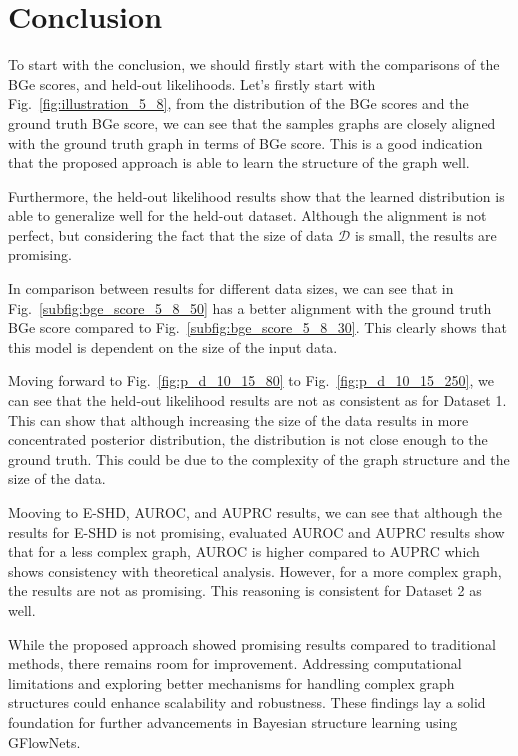 \documentclass{lxaiproposal}
\begin{document}
    \section{Conclusion}\label{sec:conclusion}
    \vspace*{-3mm}

    To start with the conclusion, we should firstly start with the comparisons of the BGe scores, and held-out
    likelihoods. Let's firstly start with Fig.~\ref{fig:illustration_5_8}, from the distribution of the BGe scores and
    the ground truth BGe score, we can see that the samples graphs are closely aligned with the ground truth graph
    in terms of BGe score. This is a good indication that the proposed approach is able to learn the structure of the
    graph well.

    Furthermore, the held-out likelihood results show that the learned distribution is able to generalize well for the
    held-out dataset. Although the alignment is not perfect, but considering the fact that the size of data $\mathcal{D}$
    is small, the results are promising.

    In comparison between results for different data sizes, we can see that in Fig.~\ref{subfig:bge_score_5_8_50}
    has a better alignment with the ground truth BGe score compared to Fig.~\ref{subfig:bge_score_5_8_30}. This
    clearly shows that this model is dependent on the size of the input data.

    Moving forward to Fig.~\ref{fig:p_d_10_15_80} to Fig.~\ref{fig:p_d_10_15_250}, we can see that the held-out
    likelihood results are not as consistent as for Dataset 1. This can show that although increasing the size of
    the data results in more concentrated posterior distribution, the distribution is not close enough to the ground
    truth. This could be due to the complexity of the graph structure and the size of the data.

    Mooving to E-SHD, AUROC, and AUPRC results, we can see that although the results for E-SHD is not promising,
    evaluated AUROC and AUPRC results show that for a less complex graph, AUROC is higher compared to AUPRC which shows
    consistency with theoretical analysis. However, for a more complex graph, the results are not as promising. This
    reasoning is consistent for Dataset 2 as well.


    While the proposed approach showed promising results compared to traditional methods, there remains room for
    improvement. Addressing computational limitations and exploring better mechanisms for handling complex graph
    structures could enhance scalability and robustness. These findings lay a solid foundation for further
    advancements in Bayesian structure learning using GFlowNets.
\end{document}
